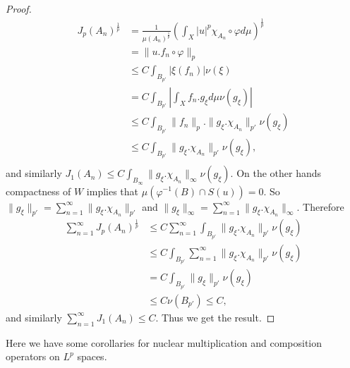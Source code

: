 \documentclass{amsart}
\theoremstyle{definition}\newtheorem{defn}[thm]{Definition}
\theoremstyle{remark}
\numberwithin{equation}{section}
\begin{document}
\begin{proof}
\begin{align*}
J_p(A_n)^{\frac{1}{p}}&=\frac{1}{\mu(A_n)^{\frac{1}{p}}}\left(\int_X|u|^p\chi_{A_n}\circ\varphi d\mu\right)^{\frac{1}{p}}\\
&=\|u.f_n\circ\varphi\|_p\\
&\leq C\int_{B_{p'}}|\xi(f_n)|\nu(\xi)\\
&=C\int_{B_{p'}}|\int_X f_n.g_{\xi}d\mu\nu(g_{\xi})|\\
&\leq C \int_{B_{p'}}\|f_n\|_p.\|g_{\xi}.\chi_{A_n}\|_{p'}\nu(g_{\xi})\\
&\leq C\int_{B_{p'}}\|g_{\xi}.\chi_{A_n}\|_{p'}\nu(g_{\xi}),\\
\end{align*}
and similarly $J_1(A_n)\leq C\int_{B_{\infty}}\|g_{\xi}.\chi_{A_n}\|_{\infty}\nu(g_{\xi})$. On the other hands compactness of $W$ implies that $\mu(\varphi^{-1}(B)\cap S(u))=0$. So $\|g_{\xi}\|_{p'}=\sum^{\infty}_{n=1}\|g_{\xi}.\chi_{A_n}\|_{p'}$ and $\|g_{\xi}\|_{\infty}=\sum^{\infty}_{n=1}\|g_{\xi}.\chi_{A_n}\|_{\infty}$. Therefore
\begin{align*}
\sum^{\infty}_{n=1}J_p(A_n)^{\frac{1}{p}}&\leq C\sum^{\infty}_{n=1}\int_{B_{p'}}\|g_{\xi}.\chi_{A_n}\|_{p'}\nu(g_{\xi})\\
&\leq C\int_{B_{p'}}\sum^{\infty}_{n=1}\|g_{\xi}.\chi_{A_n}\|_{p'}\nu(g_{\xi})\\
&=C\int_{B_{p'}}\|g_{\xi}\|_{p'}\nu(g_{\xi})\\
&\leq C\nu(B_{p'})\leq C,
\end{align*}
and similarly $\sum^{\infty}_{n=1}J_1(A_n)\leq C$.
Thus we get the result.
\end{proof}
Here we have some corollaries for nuclear multiplication and composition operators on $L^p$ spaces.
\end{document}
